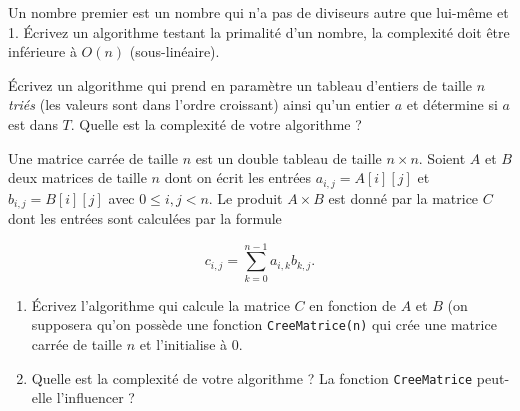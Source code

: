 \documentclass{../cours}
\begin{document}
\begin{exercice}
Un nombre premier est un nombre qui n'a pas de diviseurs autre que lui-même et 1. \'Ecrivez un algorithme testant la primalité d'un nombre, la complexité doit être inférieure à $O(n)$ (sous-linéaire).
\end{exercice}

\begin{exercice}
\'Ecrivez un algorithme qui prend en paramètre un tableau d'entiers de taille $n$ \emph{triés} (les valeurs sont dans l'ordre croissant) ainsi qu'un entier $a$ et détermine si $a$ est dans $T$. Quelle est la complexité de votre algorithme ? 
\end{exercice}

\begin{exercice}
Une matrice carrée de taille $n$ est un double tableau de taille $n \times n$. Soient $A$ et $B$ deux matrices de taille $n$ dont on écrit les entrées $a_{i,j} = A[i][j]$ et $b_{i,j} = B[i][j]$ avec $0 \leq i,j < n$. Le produit $A \times B$ est donné par la matrice $C$ dont les entrées sont calculées par la formule

\begin{equation*}
c_{i,j} = \sum_{k=0}^{n-1} a_{i,k}b_{k,j}.
\end{equation*}

\begin{enumerate}
\item \'Ecrivez l'algorithme qui calcule la matrice $C$ en fonction de $A$ et $B$ (on supposera qu'on possède une fonction \lstinline{CreeMatrice(n)} qui crée une matrice carrée de taille $n$ et l'initialise à 0.

\item Quelle est la complexité de votre algorithme ? La fonction \lstinline{CreeMatrice} peut-elle l'influencer ?
\end{enumerate}


\end{exercice}
\end{document}
